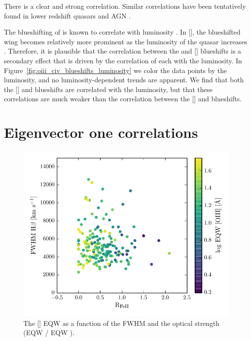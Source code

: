 There is a clear and strong correlation. 
Similar correlations have been tentatively found in lower redshift quasars and AGN \citep{zamanov02}. 


The blueshifting of  is known to correlate with luminosity \citep{richards11}.
In [], the blueshifted wing becomes relatively more prominent as the luminosity of the quasar increases \citep{shen14}. 
Therefore, it is plausible that the correlation between the  and [] blueshifts is a secondary effect that is driven by the correlation of each with the luminosity. 
In Figure~\ref{fig:oiii_civ_blueshifts_luminosity} we color the data points by the luminosity, and no luminosity-dependent trends are apparent. 
We find that both the [] and  blueshifts are correlated with the luminosity, but that these correlations are much weaker than the correlation between the [] and  blueshifts. 



\section{Eigenvector one correlations}

\begin{figure}
    \includegraphics[width=\columnwidth]{figures/chapter04/ev1.pdf} 
    \caption{The [] EQW as a function of the \hb FWHM and the optical  strength (EQW / EQW \hb).}     
    \label{fig:ev1}
\end{figure}


